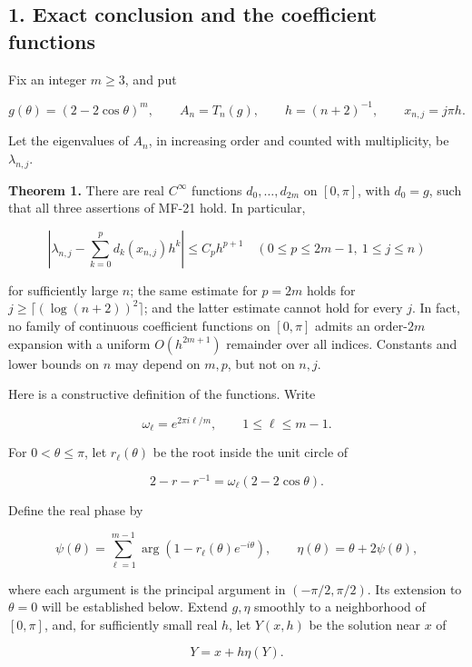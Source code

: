 \documentclass[10pt,a4paper]{article}
\begin{document}
\subsection{1. Exact conclusion and the coefficient functions}\label{exact-conclusion-and-the-coefficient-functions}

Fix an integer \(m\ge3\), and put

\nopagebreak[3]
\[
g(\theta)=(2-2\cos\theta)^m,\qquad A_n=T_n(g),\qquad h=(n+2)^{-1},\qquad x_{n,j}=j\pi h.
\]

Let the eigenvalues of \(A_n\), in increasing order and counted with multiplicity, be \(\lambda_{n,j}\).

\textbf{Theorem 1.} There are real \(C^\infty\) functions \(d_0,\ldots,d_{2m}\) on \([0,\pi]\), with \(d_0=g\), such that all three assertions of MF-21 hold. In particular,

\nopagebreak[3]
\[
\left|\lambda_{n,j}-\sum_{k=0}^{p}d_k(x_{n,j})h^k\right|\le C_p h^{p+1}
\quad(0\le p\le2m-1,\ 1\le j\le n)
\tag{1}
\]

for sufficiently large \(n\); the same estimate for \(p=2m\) holds for \(j\ge\lceil(\log(n+2))^2\rceil\); and the latter estimate cannot hold for every \(j\). In fact, no family of continuous coefficient functions on \([0,\pi]\) admits an order-\(2m\) expansion with a uniform \(O(h^{2m+1})\) remainder over all indices. Constants and lower bounds on \(n\) may depend on \(m,p\), but not on \(n,j\).

Here is a constructive definition of the functions. Write

\nopagebreak[3]
\[
\omega_\ell=e^{2\pi i\ell/m},\qquad 1\le\ell\le m-1.
\]

For \(0<\theta\le\pi\), let \(r_\ell(\theta)\) be the root inside the unit circle of

\nopagebreak[3]
\[
2-r-r^{-1}=\omega_\ell(2-2\cos\theta).
\tag{2}
\]

Define the real phase by

\nopagebreak[3]
\[
\psi(\theta)=\sum_{\ell=1}^{m-1}\arg(1-r_\ell(\theta)e^{-i\theta}),\qquad
\eta(\theta)=\theta+2\psi(\theta),
\tag{3}
\]

where each argument is the principal argument in \((-\pi/2,\pi/2)\). Its extension to \(\theta=0\) will be established below. Extend \(g,\eta\) smoothly to a neighborhood of \([0,\pi]\), and, for sufficiently small real \(h\), let \(Y(x,h)\) be the solution near \(x\) of

\nopagebreak[3]
\[
Y=x+h\eta(Y).
\tag{4}
\]
\end{document}

